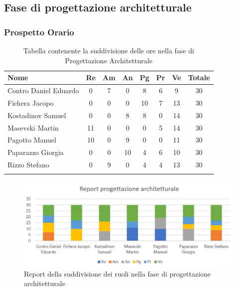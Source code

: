 \documentclass[../piano_di_progetto.tex]{subfiles}
\begin{document}
\subsection{ Fase di progettazione architetturale}%
\label{sub:fase_prog_arc}
\subsubsection{Prospetto Orario}

\begin{center}
	\begin{longtable}{|l|c|c|c|c|c|c|c|}
		\hline
		\rowcolor{lightgray}
		\textbf{Nome} & \textbf{Re} & \textbf{Am} & \textbf{An} & \textbf{Pg}  & \textbf{Pr}   & \textbf{Ve} & \textbf{Totale} \\

		\hline
			Contro Daniel Eduardo & 0 & 7 & 0 & 8 & 6 & 9 & 30\\
		\hline
			Fichera Jacopo & 0 & 0 & 0 & 10 & 7 & 13 & 30 \\
		\hline
			Kostadinov Samuel & 0 & 0 & 8 & 8 & 0 & 14 & 30 \\			
		\hline
			Masevski Martin 	& 11 & 0 & 0 & 0 & 5 & 14 & 30\\
		\hline
			Pagotto Manuel & 10 & 0 & 9 & 0 & 0 & 11 & 30 \\			
		\hline
			Paparazzo Giorgia & 0 & 0 & 10 & 4 & 6 & 10 & 30 \\
		\hline
			Rizzo Stefano & 0 & 9 & 0 & 4 & 4 & 13 & 30\\
		\hline	

		\caption{Tabella contenente la suddivisione delle ore nella fase di Progettazione Architetturale}
	\end{longtable}
\end{center}

\begin{figure}[H]
\centering
\includegraphics[width=12cm]{img/report_prog_arc}
\caption{Report della suddivisione dei ruoli nella fase di progettazione architetturale}
\end{figure}
\end{document}
